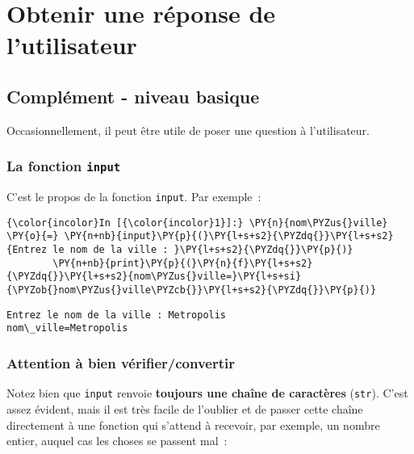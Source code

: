     \hypertarget{obtenir-une-ruxe9ponse-de-lutilisateur}{%
\section{Obtenir une réponse de
l'utilisateur}\label{obtenir-une-ruxe9ponse-de-lutilisateur}}

    \hypertarget{compluxe9ment---niveau-basique}{%
\subsection{Complément - niveau
basique}\label{compluxe9ment---niveau-basique}}

    Occasionnellement, il peut être utile de poser une question à
l'utilisateur.

    \hypertarget{la-fonction-input}{%
\subsubsection{\texorpdfstring{La fonction
\texttt{input}}{La fonction input}}\label{la-fonction-input}}

    C'est le propos de la fonction \texttt{input}. Par exemple~:

    \begin{Verbatim}[commandchars=\\\{\}]
{\color{incolor}In [{\color{incolor}1}]:} \PY{n}{nom\PYZus{}ville} \PY{o}{=} \PY{n+nb}{input}\PY{p}{(}\PY{l+s+s2}{\PYZdq{}}\PY{l+s+s2}{Entrez le nom de la ville : }\PY{l+s+s2}{\PYZdq{}}\PY{p}{)}
        \PY{n+nb}{print}\PY{p}{(}\PY{n}{f}\PY{l+s+s2}{\PYZdq{}}\PY{l+s+s2}{nom\PYZus{}ville=}\PY{l+s+si}{\PYZob{}nom\PYZus{}ville\PYZcb{}}\PY{l+s+s2}{\PYZdq{}}\PY{p}{)}
\end{Verbatim}


    \begin{Verbatim}[commandchars=\\\{\}]
Entrez le nom de la ville : Metropolis
nom\_ville=Metropolis

    \end{Verbatim}

    \hypertarget{attention-uxe0-bien-vuxe9rifierconvertir}{%
\subsubsection{Attention à bien
vérifier/convertir}\label{attention-uxe0-bien-vuxe9rifierconvertir}}

    Notez bien que \texttt{input} renvoie \textbf{toujours une chaîne de
caractères} (\texttt{str}). C'est assez évident, mais il est très facile
de l'oublier et de passer cette chaîne directement à une fonction qui
s'attend à recevoir, par exemple, un nombre entier, auquel cas les
choses se passent mal~:

